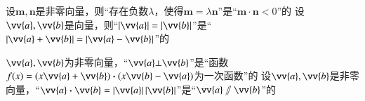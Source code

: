 \documentclass{BHCexam}
\newcommand{\xl}[2]{\vv{#1}\bm\cdot\vv{#2}}
\begin{document}
\begin{questions}
\qs 设$ \bm{m},\bm{n} $是非零向量，则“存在负数$ \lambda $，使得$ \bm{m}=\lambda\bm{n} $”是“$ \bm{m\cdot n}<0 $”的\xx
{}
\qs 设$ \vv{a},\vv{b} $是向量，则“$ \left|\vv{a}\right|=\left|\vv{b}\right| $”是“$ \left|\vv{a}+\vv{b}\right|=\left|\vv{a}-\vv{b}\right| $”的\xx
{}

\qs $\vv{a},\vv{b} $为非零向量，“$ \vv{a}\bot\vv{b} $”是“函数$ f(x)=(x\vv{a}+\vv{b})\bm\cdot(x\vv{b}-\vv{a}) $为一次函数”的\xx
{}
\qs 设$ \vv{a},\vv{b} $是非零向量，“$ \xl{a}{b}=\left|\vv{a}\right|\left|\vv{b}\right| $”是“$ \vv{a}\sslash\vv{b} $”的\xx
{}


\end{questions}
\end{document}
